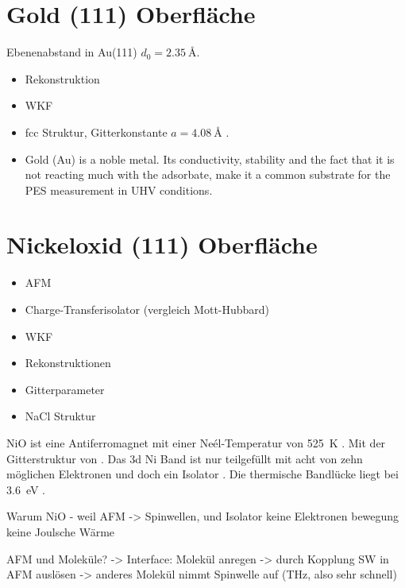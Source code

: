     \section{Gold (111) Oberfläche}
        \textbf{\cite{5A_1}}
        Ebenenabstand in Au(111) $d_0 = \SI{2.35}{\angstrom}$.

        \begin{itemize}
            \item Rekonstruktion
            \item WKF
            \item fcc Struktur, Gitterkonstante  $a=\SI{4.08}{\angstrom}$ \cite{Marx}.
            \item Gold (Au) is a noble metal. Its conductivity, stability and the fact that it is not reacting much with the adsorbate, make it a common substrate for the PES measurement in UHV conditions.
        \end{itemize}


    \section{Nickeloxid (111) Oberfläche}
        \begin{itemize}
            \item AFM
            \item Charge-Transferisolator (vergleich Mott-Hubbard)
            \item WKF
            \item Rekonstruktionen
            \item Gitterparameter
            \item NaCl Struktur
        \end{itemize}
        NiO ist eine Antiferromagnet mit einer Neél-Temperatur von \SI{525}{\kelvin} \cite{kunz_chemisorption_1985}.
        Mit der Gitterstruktur von  \cite{kunz_chemisorption_1985}.
        Das 3d Ni Band ist nur teilgefüllt mit acht von zehn möglichen Elektronen und doch ein Isolator \cite{kunz_chemisorption_1985}.
        Die thermische Bandlücke liegt bei \SI{3.6}{\electronvolt} \cite{kunz_chemisorption_1985}.

        Warum NiO - weil AFM -> Spinwellen, und Isolator keine Elektronen bewegung keine Joulsche Wärme

        AFM und Moleküle? -> Interface: Molekül anregen -> durch Kopplung SW in AFM auslösen -> anderes Molekül nimmt Spinwelle auf (THz, also sehr schnell)

